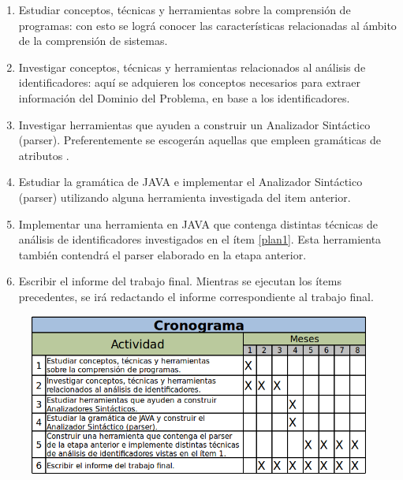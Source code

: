 \documentclass[a4paper,12pt]{report}
\begin{document}
\begin{enumerate}
\itemsep0em%
\item Estudiar conceptos, técnicas y herramientas sobre la comprensión de programas: con esto se lográ conocer las características relacionadas al ámbito de la comprensión de sistemas.

\item\label{plan1} Investigar conceptos, técnicas y herramientas relacionados al análisis de identificadores: aquí se adquieren los conceptos necesarios para extraer información del Dominio del Problema, en base a los identificadores.


\item Investigar herramientas que ayuden a construir un Analizador Sintáctico (parser). Preferentemente se escogerán aquellas que empleen gramáticas de atributos \cite{AHUL06}.

\item Estudiar la gramática de JAVA e implementar el Analizador Sintáctico (parser) utilizando alguna herramienta investigada del item anterior.

\item Implementar una herramienta en JAVA que  contenga distintas técnicas de análisis de identificadores investigados en el ítem \ref{plan1}. Esta herramienta también contendrá el parser elaborado en la etapa anterior.

\item Escribir el informe del trabajo final. Mientras se ejecutan los ítems precedentes, se irá redactando el informe correspondiente al trabajo final.
\end{enumerate}


\begin{figure}[t] %
\centerline{%
\includegraphics[scale= 0.85]{./crono.png}
}
\end{figure} 
\end{document}
